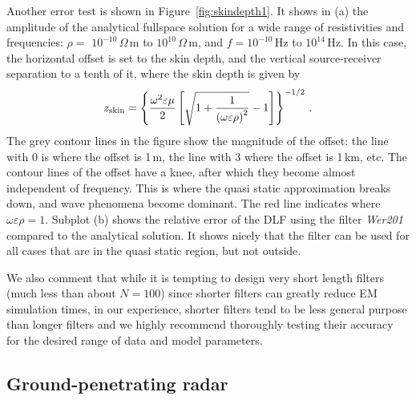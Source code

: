\documentclass[paper,twocolumn,twoside]{geophysics}
\newcommand{\mr}[1]{\mathrm{#1}}
\begin{document}
Another error test is shown in Figure~\ref{fig:skindepth1}. It shows in (a) the
amplitude of the analytical fullspace solution for a wide range of
resistivities and frequencies: $\rho=$ $10^{-10}\,\Omega\,$m to
$10^{10}\,\Omega\,$m, and $f =10^{-10}$\,Hz to $10^{14}$\,Hz. In this case, the
horizontal offset is set to the skin depth, and the vertical source-receiver
separation to a tenth of it, where the skin depth is given by \citep[e.g., ][
equation~1.49]{B.SEG.88.Ward}
%
\begin{equation}
  z_\mr{skin} = \left\{\frac{\omega^2 \varepsilon\mu}{2}
    \left[ \sqrt{1 + \frac{1}{\left(\omega\varepsilon\rho\right)^2}} -1\right]
  \right\}^{-1/2} \, . \\
  \label{eq:skin}
\end{equation}
%
The grey contour lines in the figure show the magnitude of the offset: the line
with 0 is where the offset is 1\,m, the line with 3 where the offset is 1\,km,
etc. The contour lines of the offset have a knee, after which they become
almost independent of frequency. This is where the quasi static approximation
breaks down, and wave phenomena become dominant. The red line indicates where
$\omega\varepsilon\rho = 1$. Subplot (b) shows the relative error of the DLF
using the filter \emph{Wer201} compared to the analytical solution. It shows
nicely that the filter can be used for all cases that are in the quasi static
region, but not outside.
%
%

We also comment that while it is tempting to design very short length
filters (much less than about $N=100$) since shorter filters can greatly reduce
EM simulation times, in our experience, shorter filters tend to be less general
purpose than longer filters and we highly recommend thoroughly testing their
accuracy for the desired range of data and model parameters.


\subsection{Ground-penetrating radar}
\end{document}
